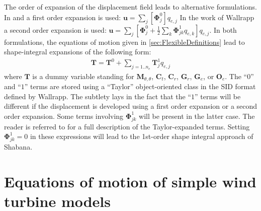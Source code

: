 \documentclass[wes, manuscript]{copernicus}
\renewcommand{\v}[1]{\boldsymbol{#1}}
\newcommand{\m}[1]{\boldsymbol{#1}}
\begin{document}
The order of expansion of the displacement field leads to alternative formulations.
In \cite{shabana:book} and \cite{branlard:2019flex} a first order expansion is used:
 $\v{u}=\sum_j [\m{\Phi}^0_j]q_{e,j}$
In the work of Wallrapp a second order expansion is used:
 $\v{u}=\sum_j \left[ \m{\Phi}^0_j + \frac{1}{2}\sum_k\m{\Phi}^1_{jk} q_{e,k}  \right]q_{e,j}$.
In both formulations, the equations of motion given in \autoref{sec:FlexibleDefinitions} lead to shape-integral expansions of the following form:
\begin{align}
\m{T} = \m{T}^0 
    + \sum\limits_{j=1..n_e} \m{T}^1_j q_{e,j}
\end{align}
where $\m{T}$ is a dummy variable standing for $\m{M}_{\theta,\theta}$, $\m{C}_t$, $\m{C}_r$, $\v{G}_r$, $\v{G}_e$, or $\v{O}_e$.
The ``$0$'' and ``$1$'' terms are stored using a ``Taylor'' object-oriented class in the SID format defined by Wallrapp.
The subtlety lays in the fact that the ``$1$'' terms will be different if the displacement is developed using a first order expansion or a second order expansion. Some terms involving $\m{\Phi}^1_{jk}$ will be present in the latter case. The reader is referred to \cite{Wallrapp:1993} for a full description of the Taylor-expanded terms. Setting $\m{\Phi}^1_{jk}=0$ in these expressions will lead to the 1st-order shape integral approach of Shabana.





\section{Equations of motion of simple wind turbine models}
\end{document}
